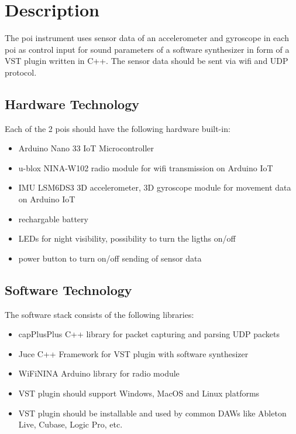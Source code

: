 \newpage
\section{Description}
The poi instrument uses sensor data of an accelerometer and gyroscope in each poi as control input for sound parameters of a software synthesizer in form of a VST plugin written in C++. The sensor data should be sent via wifi and UDP protocol.

\subsection{Hardware Technology}
\begin{description}
\item Each of the 2 pois should have the following hardware built-in:
\end{description}
\begin{itemize}
	\item Arduino Nano 33 IoT Microcontroller
	\item u-blox NINA-W102 radio module for wifi transmission on Arduino IoT 
	\item IMU LSM6DS3 3D accelerometer, 3D gyroscope module for movement data on Arduino IoT
	\item rechargable battery
	\item LEDs for night visibility, possibility to turn the ligths on/off
	\item power button to turn on/off sending of sensor data
\end{itemize}

\subsection{Software Technology}
\begin{description}
	\item The software stack consists of the following libraries:
\end{description}
\begin{itemize}
	\item capPlusPlus C++ library for packet capturing and parsing UDP packets  
	\item Juce C++ Framework for VST plugin with software synthesizer
	\item WiFiNINA Arduino library for radio module
	\item VST plugin should support Windows, MacOS and Linux platforms
	\item VST plugin should be installable and used by common DAWs like Ableton Live, Cubase, Logic Pro, etc.
\end{itemize}